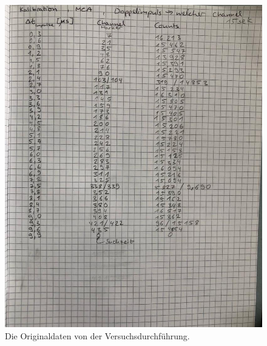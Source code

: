 \begin{figure}
    \includegraphics[width=\textwidth]{bilder/Anlage2.jpeg}
    \caption{Die Originaldaten von der Versuchsdurchführung.}
    \label{fig:originaldaten}
\end{figure}